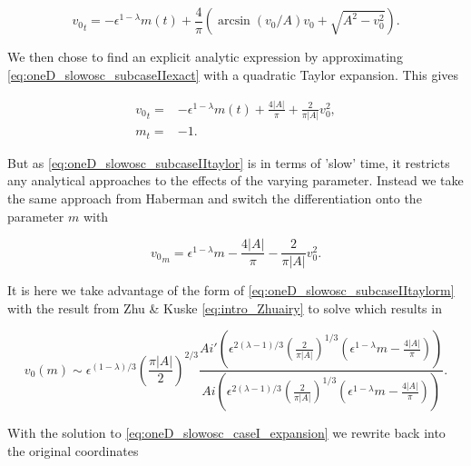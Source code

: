 \begin{equation}\label{eq:oneD_slowosc_subcaseIIexact}
{v_0}_t=-\epsilon^{1-\lambda}m(t)+\frac{4}{\pi}\left(\arcsin(v_0/A)v_0+\sqrt{A^2-v_0^2}\right).
\end{equation}

We then chose to find an explicit analytic expression by approximating \eqref{eq:oneD_slowosc_subcaseIIexact} with a quadratic Taylor expansion. This gives

\begin{equation}\label{eq:oneD_slowosc_subcaseIItaylor}
\begin{aligned}
{v_0}_t =& -\epsilon^{1-\lambda}m(t) + \frac{4|A|}{\pi} + \frac{2}{\pi |A|}v_0^2,\\
m_t =& -1.
\end{aligned}
\end{equation}

But as \eqref{eq:oneD_slowosc_subcaseIItaylor} is in terms of 'slow' time, it restricts any analytical approaches to the effects of the varying parameter. Instead we take the same approach from Haberman \cite{haberman1979slowly} and switch the differentiation onto the parameter $m$ with

\begin{equation}\label{eq:oneD_slowosc_subcaseIItaylorm}
{v_0}_m = \epsilon^{1-\lambda}m - \frac{4|A|}{\pi} - \frac{2}{\pi |A|}v_0^2.
\end{equation}

It is here we take advantage of the form of \eqref{eq:oneD_slowosc_subcaseIItaylorm} with the result from Zhu \& Kuske \eqref{eq:intro_Zhuairy} to solve which results in

\begin{equation*}
v_0(m)\sim \epsilon^{(1-\lambda)/3}\left( \frac{\pi |A|}{2} \right)^{2/3}\frac{Ai'\left(\epsilon^{2(\lambda-1)/3}\left(\frac{2}{\pi |A|}\right)^{1/3}(\epsilon^{1-\lambda}m-\frac{4|A|}{\pi})\right)}{Ai\left(\epsilon^{2(\lambda-1)/3}\left(\frac{2}{\pi |A|}\right)^{1/3}(\epsilon^{1-\lambda}m-\frac{4|A|}{\pi})\right)}.
\end{equation*}

With the solution to \eqref{eq:oneD_slowosc_caseI_expansion} we rewrite back into the original coordinates

